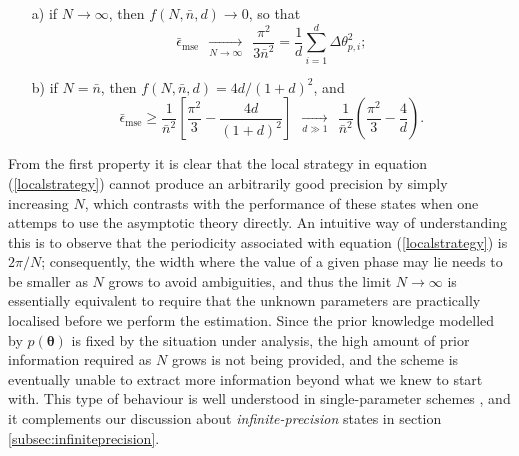 \begin{enumerate}
\item[a)] if $N \rightarrow \infty$, then $f(N,\bar{n},d) \rightarrow 0$, so that
\begin{equation}
\bar{\epsilon}_\mathrm{mse}  ~~\underset{N \rightarrow \infty}{\longrightarrow}~~  \frac{\pi^2}{3 \bar{n}^2} = \frac{1}{d} \sum_{i=1}^d \Delta \theta_{p,i}^2;
\end{equation}
\item[b)] if $N = \bar{n}$, then $f(N,\bar{n},d) = 4d/(1+d)^2$, and
\begin{equation}
\bar{\epsilon}_{\mathrm{mse}} \geqslant \frac{1}{\bar{n}^2}\left[\frac{\pi^2}{3} - \frac{4d}{(1+d)^2}\right] ~~\underset{d\gg 1}{\longrightarrow}~~ \frac{1}{\bar{n}^2}\left(\frac{\pi^2}{3} - \frac{4}{d}\right).
\label{localscaling}
\end{equation}
\end{enumerate}

From the first property it is clear that the local strategy in equation (\ref{localstrategy}) cannot produce an arbitrarily good precision by simply increasing $N$, which contrasts with the performance of these states when one attemps to use the asymptotic theory directly. An intuitive way of understanding this is to observe that the periodicity associated with equation (\ref{localstrategy}) is $2\pi/N$; consequently, the width where the value of a given phase may lie needs to be smaller as $N$ grows to avoid ambiguities, and thus the limit $N \rightarrow \infty$ is essentially equivalent to require that the unknown parameters are practically localised before we perform the estimation. Since the prior knowledge modelled by $p(\boldsymbol{\theta})$ is fixed by the situation under analysis, the high amount of prior information required as $N$ grows is not being provided, and the scheme is eventually unable to extract more information beyond what we knew to start with. This type of behaviour is well understood in single-parameter schemes \cite{tsang2012, berry2012infinite, hall2012, jesus2017, giovannetti2012subheisenberg, pezze2013, rafal2015}, and it complements our discussion about \emph{infinite-precision} states in section \ref{subsec:infiniteprecision}. 

